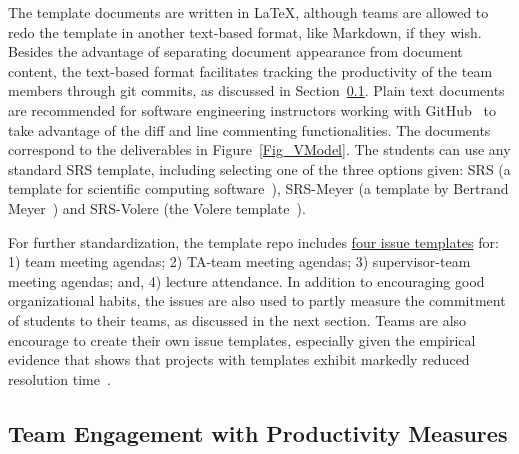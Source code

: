 \documentclass[10pt, conference]{IEEEtran}
\begin{document}
The template documents are written in \LaTeX, although teams are allowed to redo
the template in another text-based format, like Markdown, if they wish. Besides
the advantage of separating document appearance from document content, the
text-based format facilitates tracking the productivity of the team members
through git commits, as discussed in Section~\ref{Sec_TeamContribMeasure}. Plain
text documents are recommended for software engineering instructors working with
GitHub~\cite{felicianoStudentExperiencesUsing2016} to take advantage of the diff
and line commenting functionalities. The documents correspond to the
deliverables in Figure~\ref{Fig_VModel}. The students can use any standard SRS
template, including selecting one of the three options given: SRS (a template
for scientific computing software~\cite{SmithAndLai2005}), SRS-Meyer (a template
by Bertrand Meyer~\cite{Meyer2022}) and SRS-Volere (the Volere
template~\cite{RobertsonAndRobertson1999Vol}).

For further standardization, the template repo includes
\href{Redact link}
{four issue templates} for: 1) team meeting agendas; 2) TA-team meeting agendas;
3) supervisor-team meeting agendas; and, 4) lecture attendance.  In addition to
encouraging good organizational habits, the issues are also used to partly
measure the commitment of students to their teams, as discussed in the next
section.  Teams are also encourage to create their own issue templates, especially given the empirical evidence that shows that projects with templates exhibit markedly reduced resolution time~\cite{sulunEmpiricalAnalysisIssue2024}.

\subsection{Team Engagement with Productivity Measures} \label{Sec_TeamContribMeasure}
\end{document}
